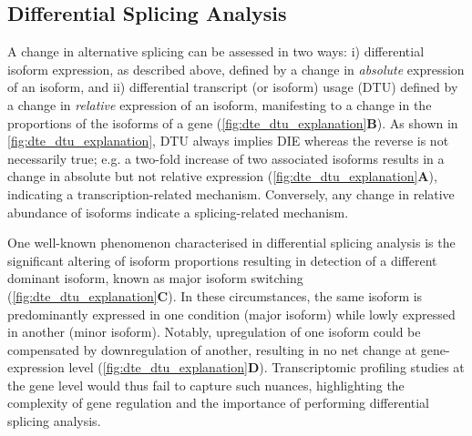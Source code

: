 \subsection{Differential Splicing Analysis}\label{intro:dtu}
A change in alternative splicing can be assessed in two ways: i) differential isoform expression, as described above, defined by a change in \textit{absolute} expression of an isoform, and ii) differential transcript (or isoform) usage (DTU) defined by a change in \textit{relative} expression of an isoform, manifesting to a change in the proportions of the isoforms of a gene (\cref{fig:dte_dtu_explanation}\textbf{B}). As shown in \cref{fig:dte_dtu_explanation}, DTU always implies DIE whereas the reverse is not necessarily true; e.g. a two-fold increase of two associated isoforms results in a change in absolute but not relative expression (\cref{fig:dte_dtu_explanation}\textbf{A}), indicating a transcription-related mechanism. Conversely, any change in relative abundance of isoforms indicate a splicing-related mechanism. 

One well-known phenomenon characterised in differential splicing analysis is the significant altering of isoform proportions resulting in detection of a different dominant isoform, known as major isoform switching (\cref{fig:dte_dtu_explanation}\textbf{C}). In these circumstances, the same isoform is predominantly expressed in one condition (major isoform) while lowly expressed in another (minor isoform). Notably, upregulation of one isoform could be compensated by downregulation of another, resulting in no net change at gene-expression level (\cref{fig:dte_dtu_explanation}\textbf{D}). Transcriptomic profiling studies at the gene level would thus fail to capture such nuances, highlighting the complexity of gene regulation and the importance of performing differential splicing analysis. 


